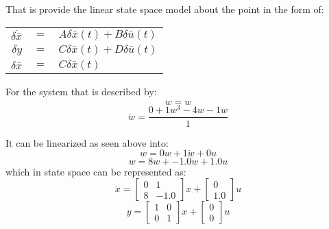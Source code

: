 \begin{enumerate}
  That is provide the linear state space model about the point in the form of:
  \begin{center}
    \begin{tabular}{r c l}
      $\delta \dot{\bar x}$ & $=$ & $A\delta\bar{x}(t) + B\delta\bar{u}(t)$\\
      $\delta y$ & $=$ & $C\delta\bar x(t) + D\delta\bar u(t)$\\
      $\delta \bar x$ & $=$ & $C\delta\bar x(t)$
    \end{tabular}
  \end{center}
  For the system that is described by:
  \begin{equation}
    \dot w = \dot w
  \end{equation}
  \begin{equation}
    \ddot w = \frac{0 + 1w^3 - 4w- 1\ddot w}{1}
  \end{equation}

  It can be linearized as seen above
  into:
  \begin{equation}
    w = 0w + 1\dot w + 0u
  \end{equation}
  \begin{equation}
    w = 8w + -1.0\dot w + 1.0u
  \end{equation}
  which in state space can be represented as:
  \begin{equation}
\dot x = \begin{bmatrix}
0 & 1\\
8 & -1.0
\end{bmatrix}
x + \begin{bmatrix}
0\\
1.0
\end{bmatrix}
u\end{equation}
\begin{equation}
y = \begin{bmatrix}
1 & 0\\
0 & 1
\end{bmatrix}
x + \begin{bmatrix}
0\\
0
\end{bmatrix}
u\end{equation}

\end{enumerate}
